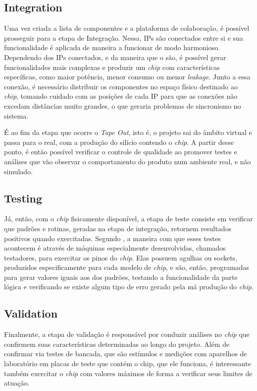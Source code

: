 \documentclass[
	12pt,				%
    oneside,			%
	a4paper,			%
	english,			%
	french,				%
	spanish,			%
	brazil				%
	]{abntex2}
\begin{document}
\subsection{Integration}

Uma vez criada a lista de componentes e a plataforma de colaboração, é possível prosseguir para a etapa de Integração. Nessa, IPs são conectados entre si e sua funcionalidade é aplicada de maneira a funcionar de modo harmonioso. Dependendo dos IPs conectados, e da maneira que o são, é possível gerar funcionalidades mais complexas e produzir um \textit{chip} com características específicas, como maior potência, menor consumo ou menor \textit{leakage}. Junto a essa conexão, é necessário distribuir os componentes no espaço físico destinado ao \textit{chip}, tomando cuidado com as posições de cada IP para que as conexões não excedam distâncias muito grandes, o que geraria problemas de sincronismo no sistema.

É ao fim da etapa que ocorre o \textit{Tape Out}, isto é, o projeto sai do âmbito virtual e passa para o real, com a produção do silício contendo o \textit{chip}. A partir desse ponto, é então possível verificar o controle de qualidade ao promover testes e análises que vão observar o comportamento do produto num ambiente real, e não simulado.

\subsection{Testing}

Já, então, com o \textit{chip} fisicamente disponível, a etapa de teste consiste em verificar que padrões e rotinas, geradas na etapa de integração, retornem resultados positivos quando exercitadas. Segundo \citeauthor{Krishnendu}, a maneira com que esses testes acontecem é através de máquinas especialmente desenvolvidas, chamados testadores, para exercitar os pinos do \textit{chip}. Elas possuem agulhas ou sockets, produzidos especificamente para cada modelo de \textit{chip}, e são, então, programadas para gerar valores iguais aos dos padrões, testando a funcionalidade da parte lógica e verificando se existe algum tipo de erro gerado pela má produção do \textit{chip}.

\subsection{Validation}

Finalmente, a etapa de validação é responsável por conduzir análises no \textit{chip} que confirmem suas características determinadas ao longo do projeto. Além de confirmar via testes de bancada, que são estímulos e medições com aparelhos de laboratório em placas de teste que contém o chip, que ele funciona, é interessante também exercitar o \textit{chip} com valores máximos de forma a verificar seus limites de atuação.
\end{document}
